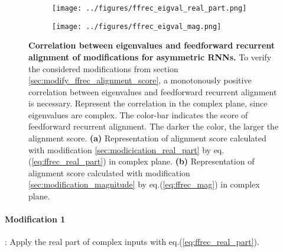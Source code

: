\documentclass[11pt]{article}
\begin{document}
		\begin{figure}[H]
			\centering
			\begin{subfigure}[b]{0.4\textwidth}
				\texttt{[image: ../figures/ffrec\_eigval\_real\_part.png]}
				\caption{}
				\label{fig:ffrec_real_part}
			\end{subfigure}
			\begin{subfigure}[b]{0.425\textwidth}
				\texttt{[image: ../figures/ffrec\_eigval\_mag.png]}
				\caption{}
				\label{fig:ffrec_mag}
			\end{subfigure}
			\caption[Correlation between eigenvalues and feedforward recurrent alignment of modifications for asymmetric RNNs]{\textbf{Correlation between eigenvalues and feedforward recurrent alignment of modifications for asymmetric RNNs.} To verify the considered modifications from section \ref{sec:modify_ffrec_alignment_score}, a monotonously positive correlation between eigenvalues and feedforward recurrent alignment is necessary. Represent the correlation in the complex plane, since eigenvalues are complex. The color-bar indicates the score of feedforward recurrent alignment. The darker the color, the larger the alignment score.  \textbf{(a)} Representation of alignment score calculated with modification \ref{sec:modicication_real_part} by eq.(\ref{eq:ffrec_real_part}) in complex plane. \textbf{(b)} Representation of alignment score calculated with modification \ref{sec:modification_magnitude} by eq.(\ref{eq:ffrec_mag}) in complex plane.}
		\end{figure}
	
	\vspace{0.5cm}
	\paragraph{Modification 1}: Apply the real part of complex inputs with eq.(\ref{eq:ffrec_real_part}).
	
\end{document}
